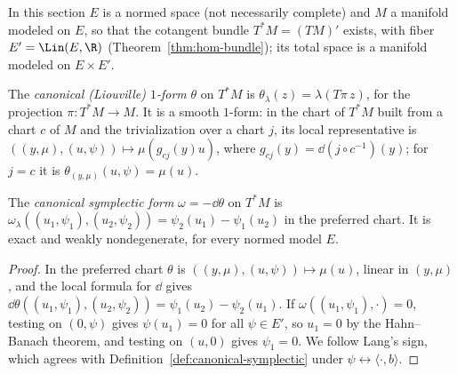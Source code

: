 In this section $E$ is a normed space (not necessarily complete) and $M$ a manifold modeled on
$E$, so that the cotangent bundle $T^*M = (TM)'$ exists, with fiber $E' = \Lin(E, \R)$
(Theorem~\ref{thm:hom-bundle}); its total space is a manifold modeled on $E \times E'$.

\begin{definition}
  \label{def:liouville-cotangent}
  \leanok
  The \emph{canonical (Liouville) $1$-form} $\theta$ on $T^*M$ is $\theta_\lambda(z) =
  \lambda(T\pi\, z)$, for the projection $\pi \colon T^*M \to M$. It is a smooth $1$-form: in the
  chart of $T^*M$ built from a chart $c$ of $M$ and the trivialization over a chart $j$, its
  local representative is $((y, \mu), (u, \psi)) \mapsto \mu(g_{cj}(y) u)$, where $g_{cj}(y) =
  \dd(j \circ c^{-1})(y)$; for $j = c$ it is $\theta_{(y, \mu)}(u, \psi) = \mu(u)$.
\end{definition}

\begin{proposition}
  \label{prop:cotangent-symplectic}
  \leanok
  The \emph{canonical symplectic form} $\omega = -\dd\theta$ on $T^*M$ is
  $\omega_\lambda((u_1, \psi_1), (u_2, \psi_2)) = \psi_2(u_1) - \psi_1(u_2)$ in the preferred
  chart. It is exact and weakly nondegenerate, for every normed model $E$.
\end{proposition}

\begin{proof}
  \leanok
  In the preferred chart $\theta$ is $((y, \mu), (u, \psi)) \mapsto \mu(u)$, linear in $(y, \mu)$,
  and the local formula for $\dd$ gives $\dd\theta((u_1, \psi_1), (u_2, \psi_2)) = \psi_1(u_2) -
  \psi_2(u_1)$. If $\omega((u_1, \psi_1), \cdot) = 0$, testing on $(0, \psi)$ gives $\psi(u_1) = 0$
  for all $\psi \in E'$, so $u_1 = 0$ by the Hahn--Banach theorem, and testing on $(u, 0)$ gives
  $\psi_1 = 0$. We follow Lang's sign, which agrees with Definition~\ref{def:canonical-symplectic}
  under $\psi \leftrightarrow \langle \cdot, b \rangle$.
\end{proof}

